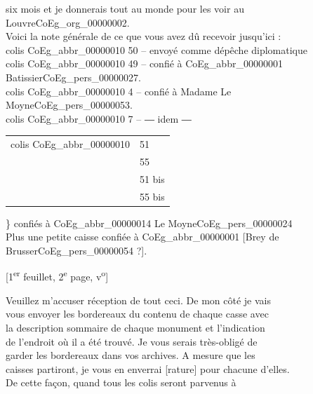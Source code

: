 \documentclass{book}
\begin{document}
six mois et je donnerais tout au monde pour les voir au\\
Louvre\gls{CoEg_org_00000002}.\\
\indent Voici la note générale de ce que vous avez dû recevoir jusqu’ici :\\
\hspace*{1cm} colis \gls{CoEg_abbr_00000010} 50 – envoyé comme dépêche diplomatique\\
\hspace*{1cm} colis \gls{CoEg_abbr_00000010} 49 – confié à \gls{CoEg_abbr_00000001} Batissier\gls{CoEg_pers_00000027}.\\
\hspace*{1cm} colis \gls{CoEg_abbr_00000010} 4 – confié à Madame Le Moyne\gls{CoEg_pers_00000053}.\\
\hspace*{1cm} colis \gls{CoEg_abbr_00000010} 7 – \hspace*{1cm} 	― idem ―\\
\hspace*{1cm}\begin{tabular}{ r l }
  colis \gls{CoEg_abbr_00000010} & 51 \\
   & 55 \\
   & 51 bis \\
   & 55 bis
\end{tabular} \Bigg\}
\hspace*{1cm} confiés à \gls{CoEg_abbr_00000014} Le Moyne\gls{CoEg_pers_00000024}\\
\hspace*{1cm}Plus une petite caisse confiée à \gls{CoEg_abbr_00000001} {[Brey de Brusser\gls{CoEg_pers_00000054} ?]}.
{\footnotesize \begin{center} {[1\textsuperscript{er} feuillet, 2\textsuperscript{e} page, v\textsuperscript{o}]}\end{center}}
\indent Veuillez m’accuser réception de tout ceci. De mon côté je vais\\
vous envoyer les bordereaux du contenu de chaque casse avec\\
la description sommaire de chaque monument et l’indication\\
de l’endroit où il a été trouvé. Je vous serais très-obligé de\\
garder les bordereaux dans vos archives. A mesure que les\\
caisses partiront, je vous en enverrai [rature] pour chacune d’elles.\\
De cette façon, quand tous les colis seront parvenus à\\
\end{document}
